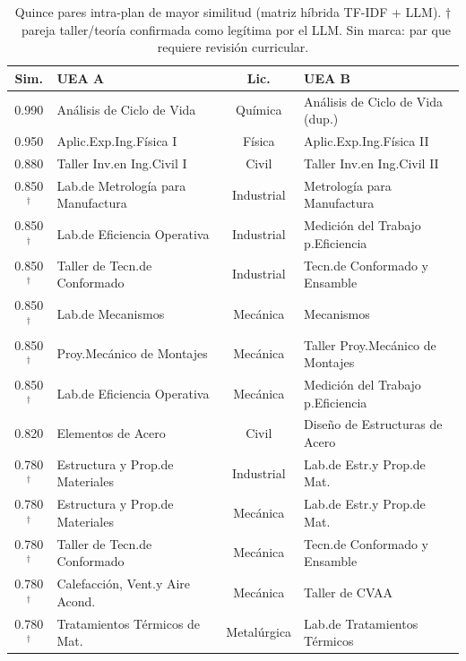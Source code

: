 \documentclass[11pt,a4paper]{article}
\begin{document}
\begin{table}[H]
\centering
\caption{Quince pares intra-plan de mayor similitud (matriz híbrida TF-IDF + LLM).
  $\dagger$~pareja taller/teoría confirmada como legítima por el LLM.
  Sin marca: par que requiere revisión curricular.}
\label{tab:intra}
\small\setlength{\tabcolsep}{4pt}
\begin{tabular}{clcl}
\toprule
\textbf{Sim.} & \textbf{UEA A} & \textbf{Lic.} & \textbf{UEA B} \\
\midrule
0.990 & Análisis de Ciclo de Vida          & Química    & Análisis de Ciclo de Vida (dup.) \\
0.950 & Aplic.\@ Exp.\@ Ing.\@ Física I   & Física     & Aplic.\@ Exp.\@ Ing.\@ Física II \\
0.880 & Taller Inv.\@ en Ing.\@ Civil I    & Civil      & Taller Inv.\@ en Ing.\@ Civil II \\
0.850$^\dagger$ & Lab.\@ de Metrología para Manufactura & Industrial & Metrología para Manufactura \\
0.850$^\dagger$ & Lab.\@ de Eficiencia Operativa    & Industrial & Medición del Trabajo p.\@ Eficiencia \\
0.850$^\dagger$ & Taller de Tecn.\@ de Conformado   & Industrial & Tecn.\@ de Conformado y Ensamble \\
0.850$^\dagger$ & Lab.\@ de Mecanismos              & Mecánica   & Mecanismos \\
0.850$^\dagger$ & Proy.\@ Mecánico de Montajes       & Mecánica   & Taller Proy.\@ Mecánico de Montajes \\
0.850$^\dagger$ & Lab.\@ de Eficiencia Operativa    & Mecánica   & Medición del Trabajo p.\@ Eficiencia \\
0.820 & Elementos de Acero                 & Civil      & Diseño de Estructuras de Acero \\
0.780$^\dagger$ & Estructura y Prop.\@ de Materiales & Industrial & Lab.\@ de Estr.\@ y Prop.\@ de Mat. \\
0.780$^\dagger$ & Estructura y Prop.\@ de Materiales & Mecánica   & Lab.\@ de Estr.\@ y Prop.\@ de Mat. \\
0.780$^\dagger$ & Taller de Tecn.\@ de Conformado   & Mecánica   & Tecn.\@ de Conformado y Ensamble \\
0.780$^\dagger$ & Calefacción, Vent.\@ y Aire Acond. & Mecánica  & Taller de CVAA \\
0.780$^\dagger$ & Tratamientos Térmicos de Mat.      & Metalúrgica & Lab.\@ de Tratamientos Térmicos \\
\bottomrule
\end{tabular}
\end{table}
\end{document}
